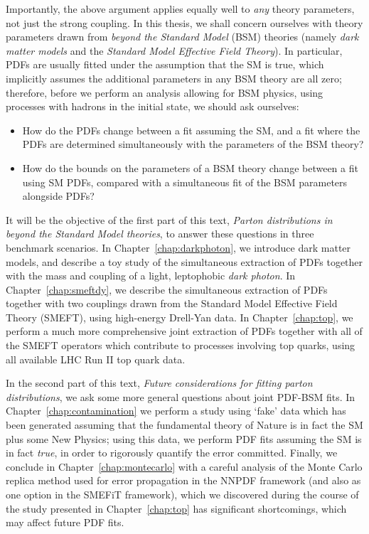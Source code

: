 \documentclass[withindex,glossary]{cam-thesis}
\begin{document}
\noindent Importantly, the above argument applies equally well to \textit{any} theory parameters, not just the strong coupling. In this thesis, we shall concern ourselves with theory parameters drawn from \textit{beyond the Standard Model} (BSM) theories (namely \textit{dark matter models} and the \textit{Standard Model Effective Field Theory}). In particular, PDFs are usually fitted under the assumption that the SM is true, which implicitly assumes the additional parameters in any BSM theory are all zero; therefore, before we perform an analysis allowing for BSM physics, using processes with hadrons in the initial state, we should ask ourselves:
\begin{itemize}
\item How do the PDFs change between a fit assuming the SM, and a fit where the PDFs are determined simultaneously with the parameters of the BSM theory?
\item How do the bounds on the parameters of a BSM theory change between a fit using SM PDFs, compared with a simultaneous fit of the BSM parameters alongside PDFs?
\end{itemize}

It will be the objective of the first part of this text, \textit{Parton distributions in beyond the Standard Model theories}, to answer these questions in three benchmark scenarios. In Chapter~\ref{chap:darkphoton}, we introduce dark matter models, and describe a toy study of the simultaneous extraction of PDFs together with the mass and coupling of a light, leptophobic \textit{dark photon}. In Chapter~\ref{chap:smeftdy}, we describe the simultaneous extraction of PDFs together with two couplings drawn from the Standard Model Effective Field Theory (SMEFT), using high-energy Drell-Yan data. In Chapter~\ref{chap:top}, we perform a much more comprehensive joint extraction of PDFs together with all of the SMEFT operators which contribute to processes involving top quarks, using all available LHC Run II top quark data.

In the second part of this text, \textit{Future considerations for fitting parton distributions}, we ask some more general questions about joint PDF-BSM fits. In Chapter~\ref{chap:contamination} we perform a study using `fake' data which has been generated assuming that the fundamental theory of Nature is in fact the SM plus some New Physics; using this data, we perform PDF fits assuming the SM is in fact \textit{true}, in order to rigorously quantify the error committed. Finally, we conclude in Chapter~\ref{chap:montecarlo} with a careful analysis of the Monte Carlo replica method used for error propagation in the NNPDF framework (and also as one option in the SMEFiT framework), which we discovered during the course of the study presented in Chapter~\ref{chap:top} has significant shortcomings, which may affect future PDF fits.
\end{document}
